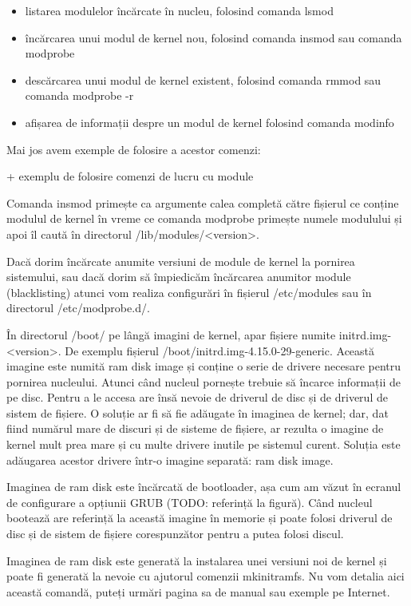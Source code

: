 \begin{itemize}
	\item listarea modulelor încărcate în nucleu, folosind comanda lsmod
	\item încărcarea unui modul de kernel nou, folosind comanda insmod sau
		comanda modprobe
	\item descărcarea unui modul de kernel existent, folosind comanda rmmod
		sau comanda modprobe -r
	\item afișarea de informații despre un modul de kernel folosind comanda
		modinfo
\end{itemize}

Mai jos avem exemple de folosire a acestor comenzi:

+ exemplu de folosire comenzi de lucru cu module

Comanda insmod primește ca argumente calea completă către fișierul ce conține
modulul de kernel în vreme ce comanda modprobe primește numele modulului și apoi
îl caută în directorul /lib/modules/<version>.

Dacă dorim încărcate anumite versiuni de module de kernel la pornirea
sistemului, sau dacă dorim să împiedicăm încărcarea anumitor module
(blacklisting) atunci vom realiza configurări în fișierul /etc/modules sau în
directorul /etc/modprobe.d/.

În directorul /boot/ pe lângă imagini de kernel, apar fișiere numite
initrd.img-<version>. De exemplu fișierul /boot/initrd.img-4.15.0-29-generic.
Această imagine este numită ram disk image și conține o serie de drivere
necesare pentru pornirea nucleului. Atunci când nucleul pornește trebuie să
încarce informații de pe disc. Pentru a le accesa are însă nevoie de driverul de
disc și de driverul de sistem de fișiere. O soluție ar fi să fie adăugate în
imaginea de kernel; dar, dat fiind numărul mare de discuri și de sisteme de
fișiere, ar rezulta o imagine de kernel mult prea mare și cu multe drivere
inutile pe sistemul curent. Soluția este adăugarea acestor drivere într-o
imagine separată: ram disk image.

Imaginea de ram disk este încărcată de bootloader, așa cum am văzut în ecranul
de configurare a opțiunii GRUB (TODO: referință la figură). Când nucleul
bootează are referință la această imagine în memorie și poate folosi driverul de
disc și de sistem de fișiere corespunzător pentru a putea folosi discul.

Imaginea de ram disk este generată la instalarea unei versiuni noi de kernel și
poate fi generată la nevoie cu ajutorul comenzii mkinitramfs. Nu vom detalia
aici această comandă, puteți urmări pagina sa de manual sau exemple pe Internet.

